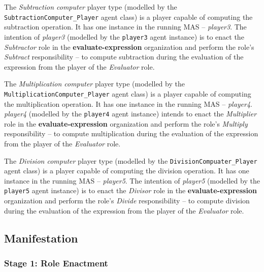 The \textit{Subtraction computer} player type (modelled by the \texttt{SubtractionComputer\_Player} agent class) is a player capable of computing the subtraction operation.
It has one instance in the running MAS -- \textit{player3}.
The intention of \textit{player3} (modelled by the \texttt{player3} agent instance) is to enact the \textit{Subtractor} role in the \textbf{evaluate-expression} organization and perform the role's \textit{Subtract} responsibility -- to compute subtraction during the evaluation of the expression from the player of the  \textit{Evaluator} role.

The \textit{Multiplication computer} player type (modelled by the \texttt{MultiplicationComputer\_Player} agent class) is a player capable of computing the multiplication operation.
It has one instance in the running MAS -- \textit{player4}.
\textit{player4} (modelled by the \texttt{player4} agent instance) intends to enact the \textit{Multiplier} role in the \textbf{evaluate-expression} organization and perform the role's \textit{Multiply} responsibility -- to compute multiplication during the evaluation of the expression from the player of the \textit{Evaluator} role.

The \textit{Division computer} player type (modelled by the \texttt{DivisionCompuater\_Player} agent class) is a player capable of computing the division operation.
It has one instance in the running MAS -- \textit{player5}.
The intention of \textit{player5} (modelled by the \texttt{player5} agent instance) is to enact the \textit{Divisor} role in the \textbf{evaluate-expression} organization and perform the role's \textit{Divide} responsibility -- to compute division during the evaluation of the expression from the player of the \textit{Evaluator} role.

\subsection*{Manifestation}

\subsubsection*{Stage 1: Role Enactment}

